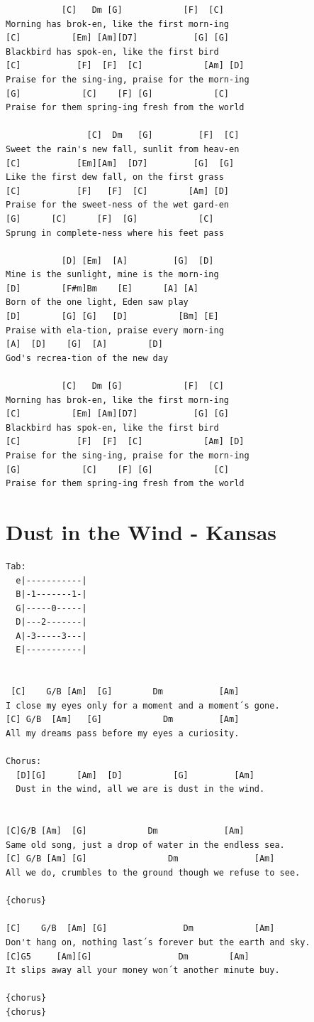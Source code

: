 \documentclass[
]{book}
\let\stdsection\section
\renewcommand\section{\clearpage\stdsection}
\begin{document}
\begin{verbatim}
           [C]   Dm [G]            [F]  [C]
Morning has brok-en, like the first morn-ing
[C]          [Em] [Am][D7]           [G] [G]
Blackbird has spok-en, like the first bird
[C]           [F]  [F]  [C]            [Am] [D]
Praise for the sing-ing, praise for the morn-ing
[G]            [C]    [F] [G]            [C]
Praise for them spring-ing fresh from the world

                [C]  Dm   [G]         [F]  [C]
Sweet the rain's new fall, sunlit from heav-en
[C]           [Em][Am]  [D7]         [G]  [G]
Like the first dew fall, on the first grass
[C]           [F]   [F]  [C]        [Am] [D]
Praise for the sweet-ness of the wet gard-en
[G]      [C]      [F]  [G]            [C]
Sprung in complete-ness where his feet pass

           [D] [Em]  [A]         [G]  [D]
Mine is the sunlight, mine is the morn-ing
[D]        [F#m]Bm    [E]      [A] [A]
Born of the one light, Eden saw play
[D]        [G] [G]   [D]          [Bm] [E]
Praise with ela-tion, praise every morn-ing
[A]  [D]    [G]  [A]        [D]
God's recrea-tion of the new day

           [C]   Dm [G]            [F]  [C]
Morning has brok-en, like the first morn-ing
[C]          [Em] [Am][D7]           [G] [G]
Blackbird has spok-en, like the first bird
[C]           [F]  [F]  [C]            [Am] [D]
Praise for the sing-ing, praise for the morn-ing
[G]            [C]    [F] [G]            [C]
Praise for them spring-ing fresh from the world
\end{verbatim}

\hypertarget{classics-dust-in-the-wind}{%
\section{Dust in the Wind - Kansas}\label{classics-dust-in-the-wind}}

\begin{verbatim}
Tab:
  e|-----------|
  B|-1-------1-|
  G|-----0-----|
  D|---2-------|
  A|-3-----3---|
  E|-----------|


 [C]    G/B [Am]  [G]        Dm           [Am]
I close my eyes only for a moment and a moment´s gone.
[C] G/B  [Am]   [G]            Dm         [Am]
All my dreams pass before my eyes a curiosity.

Chorus:
  [D][G]      [Am]  [D]          [G]         [Am]
  Dust in the wind, all we are is dust in the wind.


[C]G/B [Am]  [G]            Dm             [Am]
Same old song, just a drop of water in the endless sea.
[C] G/B [Am] [G]                Dm               [Am]
All we do, crumbles to the ground though we refuse to see.

{chorus}

[C]    G/B  [Am] [G]               Dm            [Am]
Don't hang on, nothing last´s forever but the earth and sky.
[C]G5     [Am][G]                 Dm        [Am]
It slips away all your money won´t another minute buy.

{chorus}
{chorus}

\end{verbatim}
\end{document}
